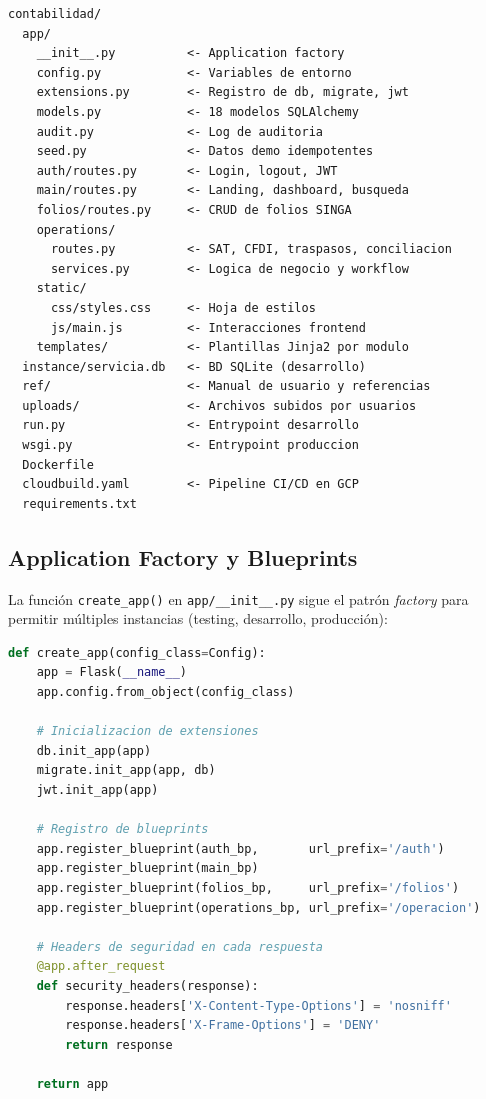 \documentclass[12pt,a4paper]{article}
\begin{document}
\begin{lstlisting}[style=plain, caption={\'Arbol de directorios del proyecto}]
contabilidad/
  app/
    __init__.py          <- Application factory
    config.py            <- Variables de entorno
    extensions.py        <- Registro de db, migrate, jwt
    models.py            <- 18 modelos SQLAlchemy
    audit.py             <- Log de auditoria
    seed.py              <- Datos demo idempotentes
    auth/routes.py       <- Login, logout, JWT
    main/routes.py       <- Landing, dashboard, busqueda
    folios/routes.py     <- CRUD de folios SINGA
    operations/
      routes.py          <- SAT, CFDI, traspasos, conciliacion
      services.py        <- Logica de negocio y workflow
    static/
      css/styles.css     <- Hoja de estilos
      js/main.js         <- Interacciones frontend
    templates/           <- Plantillas Jinja2 por modulo
  instance/servicia.db   <- BD SQLite (desarrollo)
  ref/                   <- Manual de usuario y referencias
  uploads/               <- Archivos subidos por usuarios
  run.py                 <- Entrypoint desarrollo
  wsgi.py                <- Entrypoint produccion
  Dockerfile
  cloudbuild.yaml        <- Pipeline CI/CD en GCP
  requirements.txt
\end{lstlisting}

\subsection{Application Factory y Blueprints}

La funci\'on \texttt{create\_app()} en \texttt{app/\_\_init\_\_.py} sigue el patr\'on
\textit{factory} para permitir m\'ultiples instancias (testing, desarrollo, producci\'on):

\begin{lstlisting}[language=Python, caption={Registro de blueprints en create\_app()}]
def create_app(config_class=Config):
    app = Flask(__name__)
    app.config.from_object(config_class)

    # Inicializacion de extensiones
    db.init_app(app)
    migrate.init_app(app, db)
    jwt.init_app(app)

    # Registro de blueprints
    app.register_blueprint(auth_bp,       url_prefix='/auth')
    app.register_blueprint(main_bp)
    app.register_blueprint(folios_bp,     url_prefix='/folios')
    app.register_blueprint(operations_bp, url_prefix='/operacion')

    # Headers de seguridad en cada respuesta
    @app.after_request
    def security_headers(response):
        response.headers['X-Content-Type-Options'] = 'nosniff'
        response.headers['X-Frame-Options'] = 'DENY'
        return response

    return app
\end{lstlisting}
\end{document}
